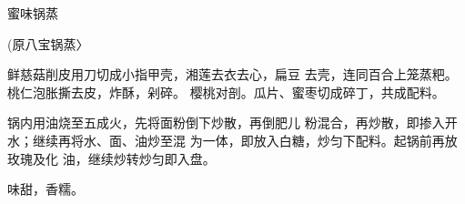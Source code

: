\begin{recipe}{蜜味锅蒸}

(原八宝锅蒸〉

\ingredients


\cooking

\step 	鲜慈菇削皮用刀切成小指甲壳，湘莲去衣去心，扁豆 去壳，连同百合上笼蒸粑。桃仁泡胀撕去皮，炸酥，剁碎。 樱桃对剖。瓜片、蜜枣切成碎丁，共成配料。

\step 	锅内用油烧至五成火，先将面粉倒下炒散，再倒肥儿 粉混合，再炒散，即掺入开水；继续再将水、面、油炒至混 为一体，即放入白糖，炒匀下配料。起锅前再放玫瑰及化 油，继续炒转炒匀即入盘。

\notes

味甜，香糯。

\end{recipe}

